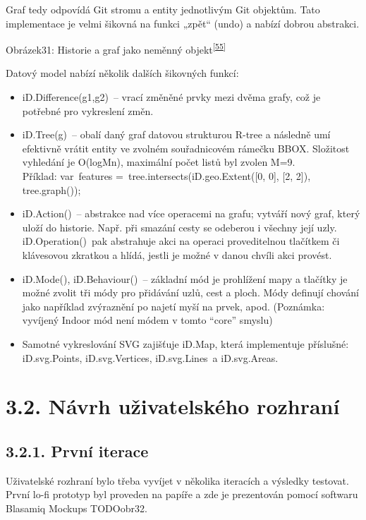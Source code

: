 Graf tedy odpovídá Git stromu a entity jednotlivým Git objektům. Tato implementace je velmi šikovná na funkci „zpět`` (undo) a nabízí dobrou abstrakci.

Obrázek31: Historie a graf jako neměnný objekt\textsuperscript{\href{}{{[}55{]}}}

Datový model nabízí několik dalších šikovných funkcí:

\begin{itemize}
\tightlist
\item
  iD.Difference(g1,g2)~-- vrací změněné prvky mezi dvěma grafy, což je potřebné pro vykreslení změn.
\item
  iD.Tree(g)~-- obalí daný graf datovou strukturou R-tree a následně umí efektivně vrátit entity ve zvolném souřadnicovém rámečku BBOX. Složitost vyhledání je O(logMn), maximální počet listů byl zvolen M=9.\\
  Příklad: var~features =~tree.intersects(iD.geo.Extent({[}0, 0{]}, {[}2, 2{]}), tree.graph());
\item
  iD.Action()~-- abstrakce nad více operacemi na grafu; vytváří nový graf, který uloží do historie. Např. při smazání cesty se odeberou i všechny její uzly. iD.Operation()~pak abstrahuje akci na operaci proveditelnou tlačítkem či klávesovou zkratkou a hlídá, jestli je možné v danou chvíli akci provést.
\item
  iD.Mode(), iD.Behaviour()~-- základní mód je prohlížení mapy a tlačítky je možné zvolit tři módy pro přidávání uzlů, cest a ploch. Módy definují chování jako například zvýraznění po najetí myší na prvek, apod. (Poznámka: vyvíjený Indoor mód není módem v tomto ``core'' smyslu)
\item
  Samotné vykreslování SVG zajišťuje iD.Map, která implementuje příslušné: iD.svg.Points, iD.svg.Vertices, iD.svg.Lines~a iD.svg.Areas.
\end{itemize}

\section{3.2. Návrh uživatelského rozhraní}\label{nuxe1vrh-uux17eivatelskuxe9ho-rozhranuxed}

\subsection{3.2.1. První iterace}\label{prvnuxed-iterace}

Uživatelské rozhraní bylo třeba vyvíjet v několika iteracích a výsledky testovat. První lo-fi prototyp byl proveden na papíře a zde je prezentován pomocí softwaru Blasamiq Mockups TODOobr32.

